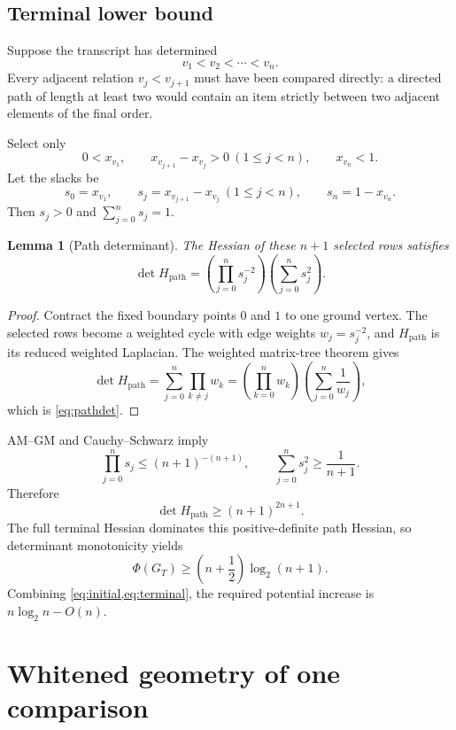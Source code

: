 \documentclass[11pt]{article}
\newtheorem{lemma}[theorem]{Lemma}
\theoremstyle{definition}
\newcommand{\PhiV}{\Phi}
\begin{document}
\subsection{Terminal lower bound}
Suppose the transcript has determined
\[
  v_1<v_2<\cdots<v_n.
\]
Every adjacent relation $v_j<v_{j+1}$ must have been compared directly: a directed path of length at least two would contain an item strictly between two adjacent elements of the final order.

Select only
\[
  0<x_{v_1},\qquad
  x_{v_{j+1}}-x_{v_j}>0\ (1\le j<n),\qquad
  x_{v_n}<1.
\]
Let the slacks be
\begin{equation}
  s_0=x_{v_1},\qquad
  s_j=x_{v_{j+1}}-x_{v_j}\ (1\le j<n),\qquad
  s_n=1-x_{v_n}.
  \label{eq:path-slacks}
\end{equation}
Then $s_j>0$ and $\sum_{j=0}^n s_j=1$.

\begin{lemma}[Path determinant]
The Hessian of these $n+1$ selected rows satisfies
\begin{equation}
  \det H_{\mathrm{path}}
  =\left(\prod_{j=0}^n s_j^{-2}\right)
   \left(\sum_{j=0}^n s_j^2\right).
  \label{eq:pathdet}
\end{equation}
\end{lemma}

\begin{proof}
Contract the fixed boundary points $0$ and $1$ to one ground vertex.  The selected rows become a weighted cycle with edge weights $w_j=s_j^{-2}$, and $H_{\mathrm{path}}$ is its reduced weighted Laplacian.  The weighted matrix-tree theorem gives
\[
  \det H_{\mathrm{path}}
  =\sum_{j=0}^n\prod_{k\ne j}w_k
  =\left(\prod_{k=0}^n w_k\right)\left(\sum_{j=0}^n\frac1{w_j}\right),
\]
which is \cref{eq:pathdet}.
\end{proof}

AM--GM and Cauchy--Schwarz imply
\[
  \prod_{j=0}^n s_j\le(n+1)^{-(n+1)},
  \qquad
  \sum_{j=0}^n s_j^2\ge\frac1{n+1}.
\]
Therefore
\[
  \det H_{\mathrm{path}}\ge(n+1)^{2n+1}.
\]
The full terminal Hessian dominates this positive-definite path Hessian, so determinant monotonicity yields
\begin{equation}
  \boxed{
  \PhiV(G_T)\ge\left(n+\frac12\right)\log_2(n+1).
  }
  \label{eq:terminal}
\end{equation}
Combining \cref{eq:initial,eq:terminal}, the required potential increase is $n\log_2n-O(n)$.

\section{Whitened geometry of one comparison}
\end{document}
